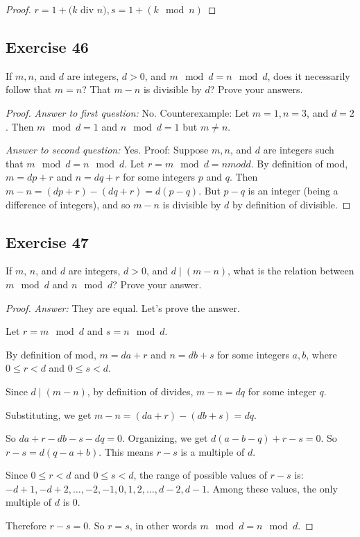 \documentclass[14pt]{extarticle}
\begin{document}
\begin{proof}
    $r = 1 + (k$ div $n), s = 1 + (k \mod n)$
\end{proof}

\subsection{Exercise 46}
If $m, n$, and $d$ are integers, $d > 0$, and $m \mod d = n \mod d$, does it necessarily follow that $m = n$? That $m - n$ is divisible by $d$? Prove your answers.

\begin{proof}
    {\it Answer to first question:} No. Counterexample: Let $m = 1, n = 3$, and $d = 2$. Then $m \mod d = 1$ and $n \mod d = 1$ but $m \neq n$.

        {\it Answer to second question:} Yes. Proof: Suppose $m, n$, and $d$ are integers such that $m \mod d = n \mod d$. Let $r = m \mod d = n mod d$. By definition of mod, $m = dp + r$ and $n = dq + r$ for some integers $p$ and $q$. Then $m - n = (dp + r) - (dq + r) = d(p - q)$. But $p - q$ is an integer (being a difference of integers), and so $m - n$ is divisible by $d$ by definition of divisible.
\end{proof}

\subsection{Exercise 47}
If $m$, $n$, and $d$ are integers, $d > 0$, and $d \mid (m - n)$, what is the relation between \\ $m \mod d$ and $n \mod d$? Prove your answer.

\begin{proof}
    {\it Answer:} They are equal. Let's prove the answer.

    Let $r = m \mod d$ and $s = n \mod d$.

    By definition of mod, $m = da+r$ and $n = db+s$ for some integers $a,b$, where $0 \leq r < d$ and $0 \leq s < d$.

    Since $d \mid (m - n)$, by definition of divides, $m-n = dq$ for some integer $q$.

    Substituting, we get $m-n = (da+r) - (db+s) = dq$.

    So $da+r-db-s-dq = 0$. Organizing, we get $d(a-b-q) + r-s = 0$. So $r-s = d(q-a+b)$. This means $r-s$ is a multiple of $d$.

    Since $0 \leq r < d$ and $0 \leq s < d$, the range of possible values of $r-s$ is: $-d+1, -d+2, \ldots, -2, -1, 0, 1, 2, \ldots, d-2, d-1$. Among these values, the only multiple of $d$ is 0.

    Therefore $r-s = 0$. So $r = s$, in other words $m \mod d = n \mod d$.
\end{proof}
\end{document}
